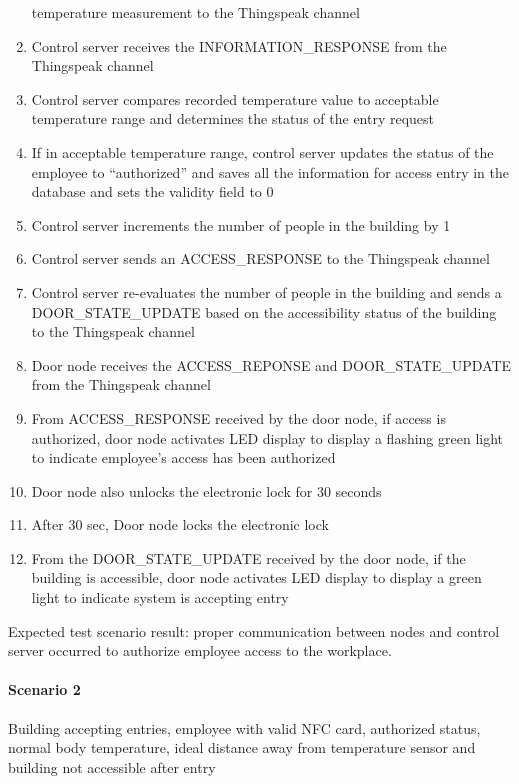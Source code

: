 \begin{enumerate}
          temperature measurement to the Thingspeak channel 
    \item Control server receives the INFORMATION\_RESPONSE from the Thingspeak
          channel
    \item Control server compares recorded temperature value to acceptable
          temperature range and determines the status of the entry request
    \item If in acceptable temperature range, control server updates the status
          of the employee to “authorized” and saves all the information for
          access entry in the database and sets the validity field to 0
    \item Control server increments the number of people in the building by 1
    \item Control server sends an ACCESS\_RESPONSE to the Thingspeak channel
    \item Control server re-evaluates the number of people in the building and
          sends a DOOR\_STATE\_UPDATE based on the accessibility status of the 
          building to the Thingspeak channel
    \item Door node receives the ACCESS\_REPONSE and DOOR\_STATE\_UPDATE from 
          the Thingspeak channel
    \item From ACCESS\_RESPONSE received by the door node, if access is
          authorized, door node activates LED display to display a flashing
          green light to indicate employee’s access has been authorized 
    \item Door node also unlocks the electronic lock for 30 seconds
    \item After 30 sec, Door node locks the electronic lock
    \item From the DOOR\_STATE\_UPDATE received by the door node, if the
          building is accessible, door node activates LED display to display a
          green light to indicate system is accepting entry
\end{enumerate}

\noindent
Expected test scenario result: proper communication between nodes and control
server occurred to authorize employee access to the workplace.


\paragraph{Scenario 2}
Building accepting entries, employee with valid NFC card, authorized status,
normal body temperature, ideal distance away from temperature sensor and
building not accessible after entry

